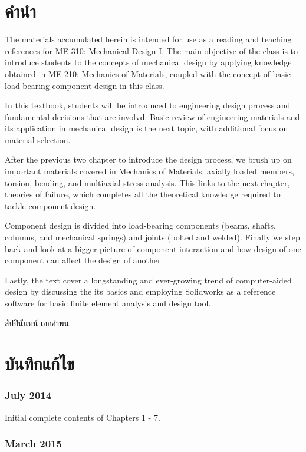 \documentclass[a4paper,openany,nobib]{tufte-book}
\begin{document}
\section*{คำนำ}
\label{sec:org4d8c84d}
The materials accumulated herein is intended for use as a reading and
teaching references for ME 310: Mechanical Design I. The main objective
of the class is to introduce students to the concepts of mechanical
design by applying knowledge obtained in ME 210: Mechanics of Materials,
coupled with the concept of basic load-bearing component design in this
class.

In this textbook, students will be introduced to engineering design
process and fundamental decisions that are involvd. Basic review of
engineering materials and its application in mechanical design is the
next topic, with additional focus on material selection.

After the previous two chapter to introduce the design process, we brush
up on important materials covered in Mechanics of Materials: axially
loaded members, torsion, bending, and multiaxial stress analysis. This
links to the next chapter, theories of failure, which completes all the
theoretical knowledge required to tackle component design.

Component design is divided into load-bearing components (beams, shafts,
columns, and mechanical springs) and joints (bolted and welded). Finally
we step back and look at a bigger picture of component interaction and
how design of one component can affect the design of another.

Lastly, the text cover a longstanding and ever-growing trend of
computer-aided design by discussing the its basics and employing
Solidworks as a reference software for basic finite element analysis and
design tool.

\vspace{2cm}
\hspace{10cm}
สัปปินันทน์ เอกอำพน

\section*{บันทึกแก้ไข}
\label{sec:orge6a64a0}
\subsubsection*{July 2014}
\label{sec:org36713e6}

Initial complete contents of Chapters 1 - 7.

\subsubsection*{March 2015}
\label{sec:org991730c}
\end{document}
